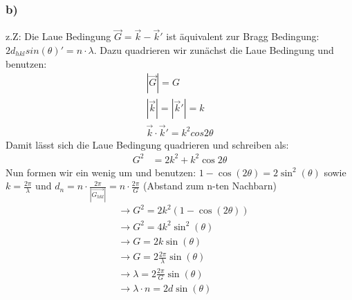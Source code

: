 \documentclass[11pt]{article}
\begin{document}
\subsubsection*{b)}
z.Z: Die Laue Bedingung $\vec{G} = \vec{k}-\vec{k}'$ ist äquivalent zur Bragg Bedingung: $2d_{hkl}sin(\theta)'=n\cdot\lambda$. Dazu quadrieren wir zunächst die Laue Bedingung und benutzen:
\begin{align*}
|\vec{G}| = G\\
|\vec{k}|=|\vec{k}'|=k\\
\vec{k}\cdot\vec{k}' = k^2cos{2\theta}
\end{align*}
Damit lässt sich die Laue Bedingung quadrieren und schreiben als:
\begin{align*}
G^2 &= 2k^2+k^2\cos{2\theta}
\end{align*}
Nun formen wir ein wenig um und benutzen: $1-\cos(2\theta)=2\sin^2(\theta)$ sowie $k = \frac{2\pi}{\lambda}$ und $d_n=n\cdot\frac{2\pi}{|\vec{G_{hkl}}|}=n\cdot\frac{2\pi}{G}$ (Abstand zum n-ten Nachbarn)
\begin{align*}
&\rightarrow G^2 = 2k^2(1-\cos(2\theta))\\
&\rightarrow G^2 = 4k^2 \sin^2(\theta)\\
&\rightarrow G = 2k \sin(\theta)\\
&\rightarrow G = 2\frac{2\pi}{\lambda}\sin(\theta)\\
&\rightarrow \lambda = 2\frac{2\pi}{G}\sin(\theta)\\
&\rightarrow \lambda \cdot n = 2d\sin(\theta)
\end{align*}
\end{document}
